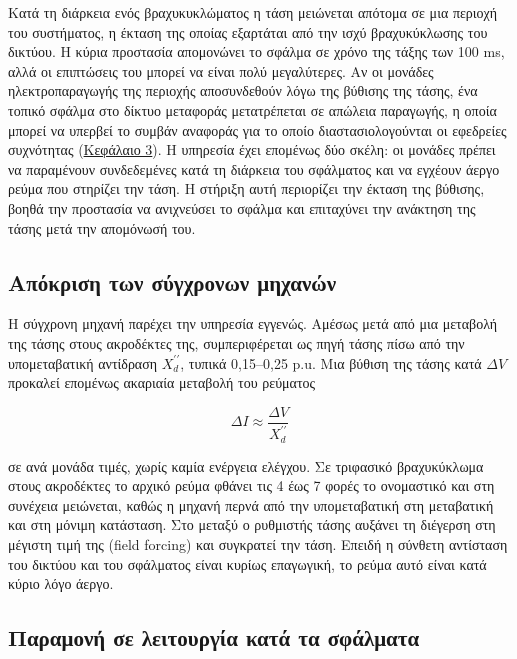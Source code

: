Κατά τη διάρκεια ενός βραχυκυκλώματος η τάση μειώνεται απότομα σε μια περιοχή του συστήματος,
η έκταση της οποίας εξαρτάται από την ισχύ βραχυκύκλωσης του δικτύου. Η κύρια προστασία
απομονώνει το σφάλμα σε χρόνο της τάξης των 100 ms, αλλά οι επιπτώσεις του μπορεί να είναι
πολύ μεγαλύτερες. Αν οι μονάδες ηλεκτροπαραγωγής της περιοχής αποσυνδεθούν λόγω της βύθισης
της τάσης, ένα τοπικό σφάλμα στο δίκτυο μεταφοράς μετατρέπεται σε απώλεια παραγωγής, η οποία
μπορεί να υπερβεί το συμβάν αναφοράς για το οποίο διαστασιολογούνται οι εφεδρείες συχνότητας
(\hyperref[kef-03-theoria]{Κεφάλαιο 3}). Η υπηρεσία έχει επομένως δύο σκέλη: οι μονάδες πρέπει
να παραμένουν συνδεδεμένες κατά τη διάρκεια του σφάλματος και να εγχέουν άεργο ρεύμα που
στηρίζει την τάση. Η στήριξη αυτή περιορίζει την έκταση της βύθισης, βοηθά την προστασία να
ανιχνεύσει το σφάλμα και επιταχύνει την ανάκτηση της τάσης μετά την απομόνωσή του.

\subsection{Απόκριση των σύγχρονων μηχανών}
\label{sec:sm-response}

Η σύγχρονη μηχανή παρέχει την υπηρεσία εγγενώς. Αμέσως μετά από μια μεταβολή της τάσης στους
ακροδέκτες της, συμπεριφέρεται ως πηγή τάσης πίσω από την υπομεταβατική αντίδραση $X_d^{\prime\prime}$,
τυπικά 0,15--0,25 p.u. Μια βύθιση της τάσης κατά $\Delta V$ προκαλεί επομένως ακαριαία
μεταβολή του ρεύματος

\begin{equation}
\Delta I \approx \frac{\Delta V}{X_d^{\prime\prime}}
\label{eq:sm-dI}
\end{equation}

σε ανά μονάδα τιμές, χωρίς καμία ενέργεια ελέγχου. Σε τριφασικό βραχυκύκλωμα στους ακροδέκτες
το αρχικό ρεύμα φθάνει τις 4 έως 7 φορές το ονομαστικό και στη συνέχεια μειώνεται, καθώς η
μηχανή περνά από την υπομεταβατική στη μεταβατική και στη μόνιμη κατάσταση. Στο μεταξύ ο
ρυθμιστής τάσης αυξάνει τη διέγερση στη μέγιστη τιμή της (field forcing) και συγκρατεί την
τάση. Επειδή η σύνθετη αντίσταση του δικτύου και του σφάλματος είναι κυρίως επαγωγική, το ρεύμα
αυτό είναι κατά κύριο λόγο άεργο.

\subsection{Παραμονή σε λειτουργία κατά τα σφάλματα}
\label{sec:frt-req}


